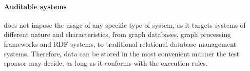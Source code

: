 \paragraph*{Auditable systems}
\ldbcsnb does not impose the usage of any specific type of system, as it targets systems of different nature and characteristics, from graph databases, graph processing frameworks and RDF systems, to traditional relational database management systems. Therefore, data can be stored in the most convenient manner the test sponsor may decide, as long as it conforms with the execution rules.
